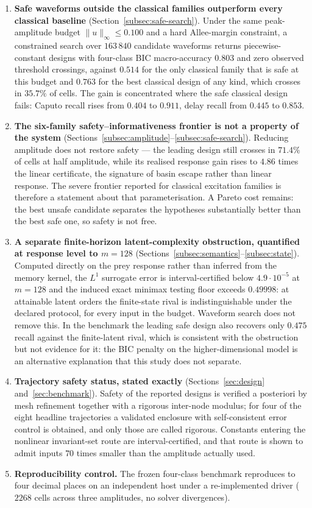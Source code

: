 \begin{enumerate}
    \item \textbf{Safe waveforms outside the classical families outperform every classical baseline} (Section~\ref{subsec:safe-search}). Under the same peak-amplitude budget $\|u\|_\infty\le0.100$ and a hard Allee-margin constraint, a constrained search over $163\,840$ candidate waveforms returns piecewise-constant designs with four-class BIC macro-accuracy $0.803$ and zero observed threshold crossings, against $0.514$ for the only classical family that is safe at this budget and $0.763$ for the best classical design of any kind, which crosses in $35.7\%$ of cells. The gain is concentrated where the safe classical design fails: Caputo recall rises from $0.404$ to $0.911$, delay recall from $0.445$ to $0.853$.
    \item \textbf{The six-family safety--informativeness frontier is not a property of the system} (Sections~\ref{subsec:amplitude}--\ref{subsec:safe-search}). Reducing amplitude does not restore safety --- the leading design still crosses in $71.4\%$ of cells at half amplitude, while its realised response gain rises to $4.86$ times the linear certificate, the signature of basin escape rather than linear response. The severe frontier reported for classical excitation families is therefore a statement about that parameterisation. A Pareto cost remains: the best unsafe candidate separates the hypotheses substantially better than the best safe one, so safety is not free.
    \item \textbf{A separate finite-horizon latent-complexity obstruction, quantified at response level to $m=128$} (Sections~\ref{subsec:semantics}--\ref{subsec:state}). Computed directly on the prey response rather than inferred from the memory kernel, the $L^1$ surrogate error is interval-certified below $4.9\cdot10^{-5}$ at $m=128$ and the induced exact minimax testing floor exceeds $0.49998$: at attainable latent orders the finite-state rival is indistinguishable under the declared protocol, for every input in the budget. Waveform search does not remove this. In the benchmark the leading safe design also recovers only $0.475$ recall against the finite-latent rival, which is consistent with the obstruction but not evidence for it: the BIC penalty on the higher-dimensional model is an alternative explanation that this study does not separate.
    \item \textbf{Trajectory safety status, stated exactly} (Sections~\ref{sec:design} and~\ref{sec:benchmark}). Safety of the reported designs is verified a posteriori by mesh refinement together with a rigorous inter-node modulus; for four of the eight headline trajectories a validated enclosure with self-consistent error control is obtained, and only those are called rigorous. Constants entering the nonlinear invariant-set route are interval-certified, and that route is shown to admit inputs $70$ times smaller than the amplitude actually used.
    \item \textbf{Reproducibility control.} The frozen four-class benchmark reproduces to four decimal places on an independent host under a re-implemented driver ($2268$ cells across three amplitudes, no solver divergences).
\end{enumerate}

